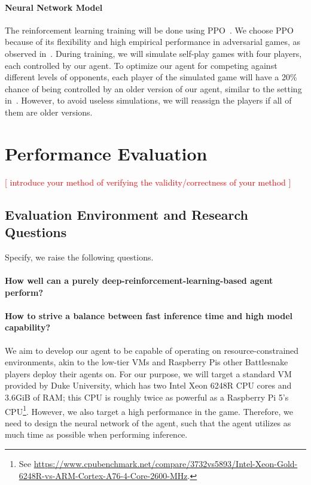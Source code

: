 \documentclass[conference]{IEEEtran}
\newcommand{\todo}[1]{\textcolor{red}{[ #1 ]}}
\begin{document}
\paragraph{Neural Network Model}
The reinforcement learning training will be done using
PPO~\cite{schulman2017proximal}.
We choose PPO because of its flexibility and high empirical performance in
adversarial games,
as observed
in~\cite{berner2019dota,binnersley2020battlesnake,chung2020battlesnake}.
During training, we will simulate self-play games with four players,
each controlled by our agent.
To optimize our agent for competing against different levels of opponents,
each player of the simulated game will have a 20\% chance of being controlled by
an older version of our agent,
similar to the setting in~\cite{silver2017mastering}. However,
to avoid useless simulations,
we will reassign the players if all of them are older versions.

\section{Performance Evaluation}

\todo{introduce your method of verifying the validity/correctness of your method}

\subsection{Evaluation Environment and Research Questions}

Specify, we raise the following questions.

\paragraph{How well can a purely deep-reinforcement-learning-based agent
    perform?
}

\paragraph{How to strive a balance between fast inference time and high model
    capability?
}
We aim to develop our agent to be capable of operating on resource-constrained
environments,
akin to the low-tier VMs and Raspberry Pis other Battlesnake players deploy
their agents on. For our purpose,
we will target a standard VM provided by Duke University,
which has two Intel Xeon 6248R CPU cores and 3.6GiB of RAM;
this CPU is roughly twice as powerful as a Raspberry Pi 5's CPU\footnote{See
    \url{https://www.cpubenchmark.net/compare/3732vs5893/Intel-Xeon-Gold-6248R-vs-ARM-Cortex-A76-4-Core-2600-MHz}.
}. However, we also target a high performance in the game. Therefore,
we need to design the neural network of the agent,
such that the agent utilizes as much time as possible when performing inference.
\end{document}
